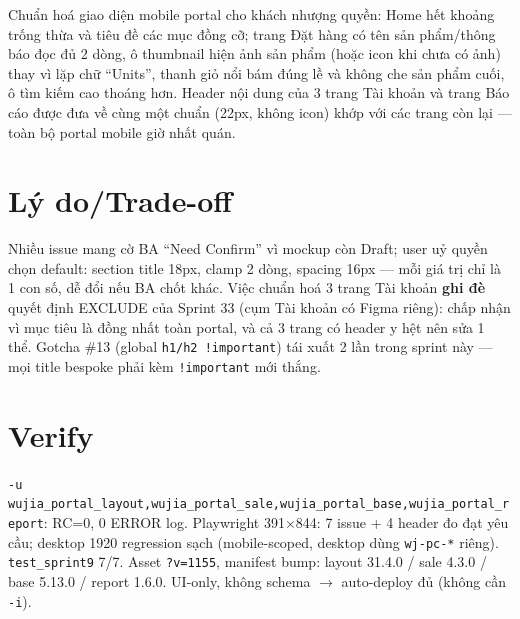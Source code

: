 Chuẩn hoá giao diện mobile portal cho khách nhượng quyền: Home hết khoảng trống thừa và tiêu đề các
mục đồng cỡ; trang Đặt hàng có tên sản phẩm/thông báo đọc đủ 2 dòng, ô thumbnail hiện ảnh sản phẩm
(hoặc icon khi chưa có ảnh) thay vì lặp chữ ``Units'', thanh giỏ nổi bám đúng lề và không che sản phẩm
cuối, ô tìm kiếm cao thoáng hơn. Header nội dung của 3 trang Tài khoản và trang Báo cáo được đưa về cùng
một chuẩn (22px, không icon) khớp với các trang còn lại --- toàn bộ portal mobile giờ nhất quán.

\section{Lý do/Trade-off}

Nhiều issue mang cờ BA ``Need Confirm'' vì mockup còn Draft; user uỷ quyền chọn default: section title
18px, clamp 2 dòng, spacing 16px --- mỗi giá trị chỉ là 1 con số, dễ đổi nếu BA chốt khác. Việc chuẩn hoá
3 trang Tài khoản \textbf{ghi đè} quyết định EXCLUDE của Sprint 33 (cụm Tài khoản có Figma riêng): chấp nhận
vì mục tiêu là đồng nhất toàn portal, và cả 3 trang có header y hệt nên sửa 1 thể. Gotcha \#13 (global
\texttt{h1/h2 !important}) tái xuất 2 lần trong sprint này --- mọi title bespoke phải kèm \texttt{!important}
mới thắng.

\section{Verify}

\texttt{-u wujia\_portal\_layout,wujia\_portal\_sale,wujia\_portal\_base,wujia\_portal\_report}: RC=0,
0 ERROR log. Playwright 391$\times$844: 7 issue + 4 header đo đạt yêu cầu; desktop 1920 regression sạch
(mobile-scoped, desktop dùng \texttt{wj-pc-*} riêng). \texttt{test\_sprint9} 7/7. Asset \texttt{?v=1155},
manifest bump: layout 31.4.0 / sale 4.3.0 / base 5.13.0 / report 1.6.0. UI-only, không schema $\to$
auto-deploy đủ (không cần \texttt{-i}).
